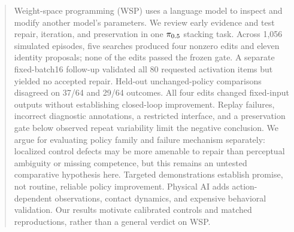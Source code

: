 \begin{abstract}
Weight-space programming (WSP) uses a language model to inspect and modify another model's parameters. We review early evidence and test repair, iteration, and preservation in one $\policy$ stacking task. Across 1,056 simulated episodes, five searches produced four nonzero edits and eleven identity proposals; none of the edits passed the frozen gate. A separate fixed-batch16 follow-up validated all 80 requested activation items but yielded no accepted repair. Held-out unchanged-policy comparisons disagreed on 37/64 and 29/64 outcomes. All four edits changed fixed-input outputs without establishing closed-loop improvement. Replay failures, incorrect diagnostic annotations, a restricted interface, and a preservation gate below observed repeat variability limit the negative conclusion. We argue for evaluating policy family and failure mechanism separately: localized control defects may be more amenable to repair than perceptual ambiguity or missing competence, but this remains an untested comparative hypothesis here. Targeted demonstrations establish promise, not routine, reliable policy improvement. Physical AI adds action-dependent observations, contact dynamics, and expensive behavioral validation. Our results motivate calibrated controls and matched reproductions, rather than a general verdict on WSP.
\end{abstract}
